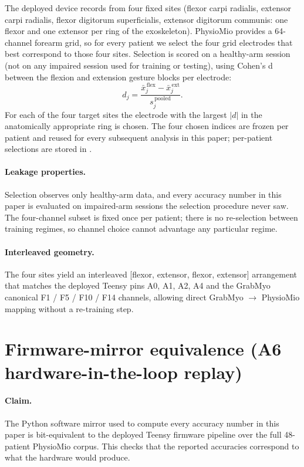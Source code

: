 \documentclass{article}
\begin{document}
The deployed device records from four fixed sites (flexor carpi radialis, extensor carpi radialis, flexor digitorum superficialis, extensor digitorum communis: one flexor and one extensor per ring of the exoskeleton). PhysioMio provides a 64-channel forearm grid, so for every patient we select the four grid electrodes that best correspond to those four sites. Selection is scored on a healthy-arm session (not on any impaired session used for training or testing), using Cohen's d between the flexion and extension gesture blocks per electrode:
\[
  d_j = \frac{\bar{x}^{\,\mathrm{flex}}_j - \bar{x}^{\,\mathrm{ext}}_j}{s^{\,\mathrm{pooled}}_j}.
\]
For each of the four target sites the electrode with the largest $|d|$ in the anatomically appropriate ring is chosen. The four chosen indices are frozen per patient and reused for every subsequent analysis in this paper; per-patient selections are stored in .

\paragraph{Leakage properties.} Selection observes only healthy-arm data, and every accuracy number in this paper is evaluated on impaired-arm sessions the selection procedure never saw. The four-channel subset is fixed once per patient; there is no re-selection between training regimes, so channel choice cannot advantage any particular regime.

\paragraph{Interleaved geometry.} The four sites yield an interleaved [flexor, extensor, flexor, extensor] arrangement that matches the deployed Teensy pins A0, A1, A2, A4 and the GrabMyo canonical F1 / F5 / F10 / F14 channels, allowing direct GrabMyo $\rightarrow$ PhysioMio mapping without a re-training step.

\section{Firmware-mirror equivalence (A6 hardware-in-the-loop replay)}
\label{app:firmware}

\paragraph{Claim.} The Python software mirror used to compute every accuracy number in this paper is bit-equivalent to the deployed Teensy firmware pipeline over the full 48-patient PhysioMio corpus. This checks that the reported accuracies correspond to what the hardware would produce.
\end{document}
